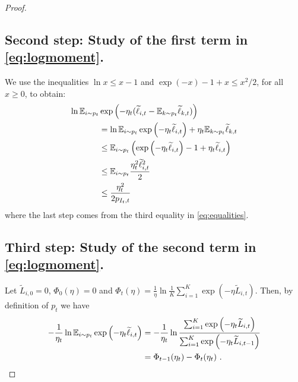 \documentclass[11pt]{hackednow}
\newcommand{\E}{\mathbb{E}}
\renewcommand{\tilde}{\widetilde}
\begin{document}
\begin{proof}
\subsection*{Second step: Study of the first term in \eqref{eq:logmoment}.}
%
We use the inequalities $\ln x \leq x-1$ and $\exp(-x) - 1 + x \leq x^2/2$, for all $x \geq 0$, to obtain:
\begin{align}
\ln \E_{i \sim p_t} &\exp{\left(- \eta_t (\tilde{\ell}_{i,t} - \E_{k \sim p_t} \tilde{\ell}_{k,t}) \right)} \notag \\
& =  \ln \E_{i \sim p_t} \exp{\left(- \eta_t \tilde{\ell}_{i,t}\right)} + \eta_t \E_{k \sim p_t} \tilde{\ell}_{k,t} \notag \\
&\leq \E_{i \sim p_t} \left(\exp{\left(- \eta_t \tilde{\ell}_{i,t}\right)} - 1 + \eta_t \tilde{\ell}_{i,t} \right) \notag \\
&\leq \E_{i \sim p_t} \frac{\eta_t^2 \tilde{\ell}_{i,t}^2}{2} \notag \\
&\leq \frac{\eta_t^2}{2 p_{I_t,t}} \label{eq:secondstep}
\end{align}
where the last step comes from the third equality in \eqref{eq:equalities}.

\subsection*{Third step: Study of the second term in \eqref{eq:logmoment}.}
%
Let $\tilde{L}_{i,0}=0$, $\Phi_0(\eta)=0$ and $\Phi_t(\eta) = \frac{1}{\eta} \ln \frac{1}{K} \sum_{i=1}^K \exp{\left(- \eta \tilde{L}_{i,t}\right)}$. Then, by definition of $p_t$ we have
\begin{align}
- \frac{1}{\eta_t} \ln \E_{i \sim p_t} \exp{\left(- \eta_t \tilde{\ell}_{i,t} \right)} 
& = - \frac{1}{\eta_t} \ln \frac{\sum_{i=1}^K \exp{\left(- \eta_t \tilde{L}_{i,t}\right)}}{\sum_{i=1}^K \exp{\left(- \eta_t \tilde{L}_{i,t-1}\right)}} \notag \\
& = \Phi_{t-1}(\eta_t) - \Phi_{t}(\eta_t)~. \label{eq:thirdstep}
\end{align}


\end{proof}
\end{document}
